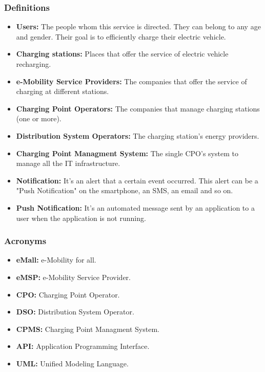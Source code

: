 \subsubsection{Definitions}
\begin{itemize}
        \item \textbf{Users:} The people whom this service is directed. 
        They can belong to any age and gender. \label{Users}
        Their goal is to efficiently charge their electric vehicle.
        \item \textbf{Charging stations:} Places that offer the service of electric vehicle recharging.
        \item \textbf{e-Mobility Service Providers:} The companies that offer the service of charging at different stations.
        \item \textbf{Charging Point Operators:} The companies that manage charging stations (one or more).
        \item \textbf{Distribution System Operators:} The charging station's energy providers.
        \item \textbf{Charging Point Managment System:} The single CPO's system to manage all the IT infrastructure.
        \item \textbf{Notification:} It's an alert that a certain event occurred. 
        This alert can be a "Push Notification" on the smartphone, an SMS, an email and so on.
        \item \textbf{Push Notification:} It's an automated message sent by an application to a user when the application is not running.
\end{itemize}
\subsubsection{Acronyms}
\begin{itemize}
        \item \textbf{eMall:} e-Mobility for all.
        \item \textbf{eMSP:} e-Mobility Service Provider.
        \item \textbf{CPO:} Charging Point Operator.
        \item \textbf{DSO:} Distribution System Operator.
        \item \textbf{CPMS:} Charging Point Managment System.
        \item \textbf{API:} Application Programming Interface.
        \item \textbf{UML:} Unified Modeling Language.
\end{itemize}

